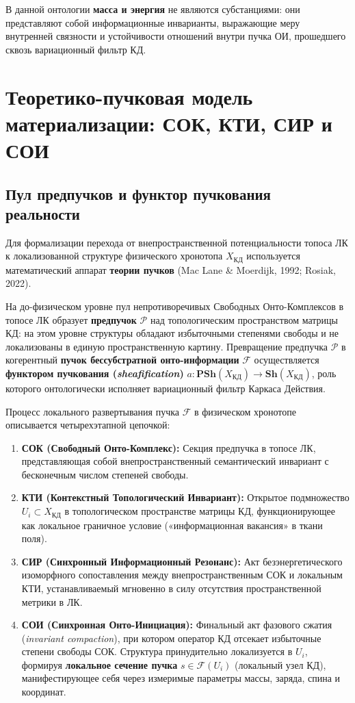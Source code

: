 \documentclass[12pt,a4paper]{article}
\begin{document}
В данной онтологии \textbf{масса и энергия} не являются субстанциями: они представляют собой информационные инварианты, выражающие меру внутренней связности и устойчивости отношений внутри пучка ОИ, прошедшего сквозь вариационный фильтр КД.

\section{Теоретико-пучковая модель материализации: СОК, КТИ, СИР и СОИ}

\subsection{Пул предпучков и функтор пучкования реальности}
Для формализации перехода от внепространственной потенциальности топоса ЛК к локализованной структуре физического хронотопа $X_{\text{КД}}$ используется математический аппарат \textbf{теории пучков} (Mac Lane \& Moerdijk, 1992; Rosiak, 2022).

На до-физическом уровне пул непротиворечивых Свободных Онто-Комплексов в топосе ЛК образует \textbf{предпучок} $\mathcal{P}$ над топологическим пространством матрицы КД: на этом уровне структуры обладают избыточными степенями свободы и не локализованы в единую пространственную картину. Превращение предпучка $\mathcal{P}$ в когерентный \textbf{пучок бессубстратной онто-информации} $\mathcal{F}$ осуществляется \textbf{функтором пучкования (\textit{sheafification})} $a: \mathbf{PSh}(X_{\text{КД}}) \to \mathbf{Sh}(X_{\text{КД}})$, роль которого онтологически исполняет вариационный фильтр Каркаса Действия.

Процесс локального развертывания пучка $\mathcal{F}$ в физическом хронотопе описывается четырехэтапной цепочкой:
\begin{enumerate}
    \item \textbf{СОК (Свободный Онто-Комплекс):} Секция предпучка в топосе ЛК, представляющая собой внепространственный семантический инвариант с бесконечным числом степеней свободы.
    \item \textbf{КТИ (Контекстный Топологический Инвариант):} Открытое подмножество $U_i \subset X_{\text{КД}}$ в топологическом пространстве матрицы КД, функционирующее как локальное граничное условие («информационная вакансия» в ткани поля).
    \item \textbf{СИР (Синхронный Информационный Резонанс):} Акт безэнергетического изоморфного сопоставления между внепространственным СОК и локальным КТИ, устанавливаемый мгновенно в силу отсутствия пространственной метрики в ЛК.
    \item \textbf{СОИ (Синхронная Онто-Инициация):} Финальный акт фазового сжатия (\textit{invariant compaction}), при котором оператор КД отсекает избыточные степени свободы СОК. Структура принудительно локализуется в $U_i$, формируя \textbf{локальное сечение пучка} $s \in \mathcal{F}(U_i)$ (локальный узел КД), манифестирующее себя через измеримые параметры массы, заряда, спина и координат.
\end{enumerate}
\end{document}
